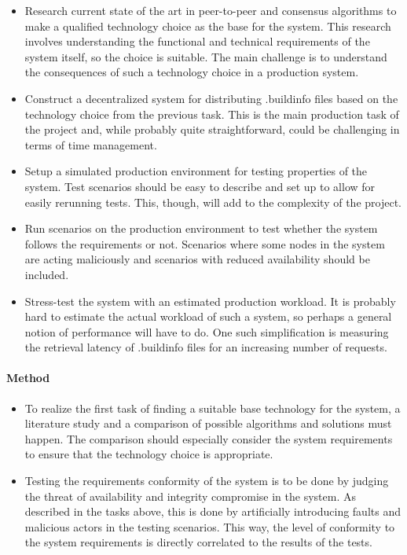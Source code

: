 \documentclass{article}
\begin{document}
\begin{itemize}
	\item Research current state of the art in peer-to-peer and consensus algorithms to make a qualified technology choice as the base for the system. This research involves understanding the functional and technical requirements of the system itself, so the choice is suitable. The main challenge is to understand the consequences of such a technology choice in a production system.
	\item Construct a decentralized system for distributing .buildinfo files based on the technology choice from the previous task. This is the main production task of the project and, while probably quite straightforward, could be challenging in terms of time management. 
	\item Setup a simulated production environment for testing properties of the system. Test scenarios should be easy to describe and set up to allow for easily rerunning tests. This, though, will add to the complexity of the project.
	\item Run scenarios on the production environment to test whether the system follows the requirements or not. Scenarios where some nodes in the system are acting maliciously and scenarios with reduced availability should be included. 
	\item Stress-test the system with an estimated production workload. It is probably hard to estimate the actual workload of such a system, so perhaps a general notion of performance will have to do. One such simplification is measuring the retrieval latency of .buildinfo files for an increasing number of requests.
\end{itemize}

\paragraph{Method}
\begin{itemize}
	\item To realize the first task of finding a suitable base technology for the system, a literature study and a comparison of possible algorithms and solutions must happen. The comparison should especially consider the system requirements to ensure that the technology choice is appropriate.
	\item Testing the requirements conformity of the system is to be done by judging the threat of availability and integrity compromise in the system. As described in the tasks above, this is done by artificially introducing faults and malicious actors in the testing scenarios. This way, the level of conformity to the system requirements is directly correlated to the results of the tests.
\end{itemize}
\end{document}
